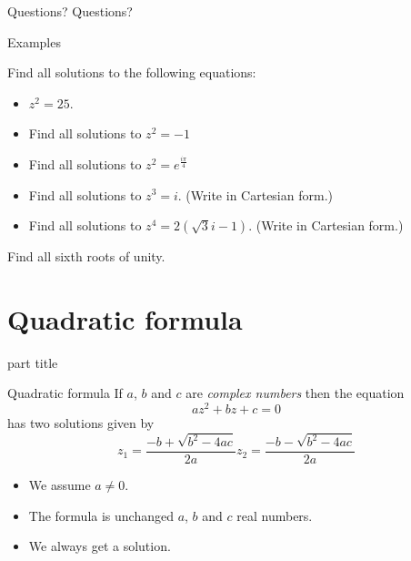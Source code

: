 \documentclass{beamer}
\begin{document}
\begin{frame}{Questions?}
Questions?
\end{frame}

\begin{frame}{Examples}
\begin{example}
Find all solutions to the following equations:
\begin{itemize}
	\item $z^2 = 25$. %
	\item Find all solutions to $z^2 = -1$ %
	\item Find all solutions to $z^2 = e^{\frac{i\pi}{4}}$ %
	\item Find all solutions to $z^3 = i$. (Write in Cartesian form.) %
	\item Find all solutions to $z^4 = 2(\sqrt{3}i-1)$. (Write in Cartesian form.) %
\end{itemize}
\end{example}
\begin{example}
Find all sixth roots of unity.
\end{example}
\end{frame}

\section{Quadratic formula}

\begin{frame}
\begin{beamercolorbox}[sep=12pt,center]{part title}
\insertsection\par
\end{beamercolorbox}
\end{frame}

\begin{frame}{Quadratic formula}
If $a$, $b$ and $c$ are \emph{complex numbers} then the equation
\begin{equation*}
az^2+bz+c = 0
\end{equation*}
has two solutions given by
\begin{equation*}
	z_1 = \frac{-b+\sqrt{b^2-4ac}}{2a} z_2 = \frac{-b-\sqrt{b^2-4ac}}{2a}
\end{equation*}
\begin{itemize}
	\item We assume $a\neq 0$.
	\item The formula is unchanged $a$, $b$ and $c$ real numbers.
	\item We always get a solution.
\end{itemize}
\end{frame}
\end{document}
